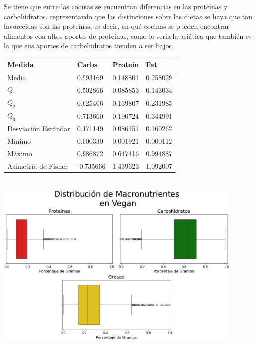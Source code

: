 \documentclass[12pt,a4paper]{article}
\begin{document}
{{{            Se tiene que entre las cocinas se encuentran diferencias en las 
            proteínas y carbohidratos, representando que las distinciones sobre 
            las dietas se haya que tan favorecidas son las proteínas, es decir, 
            en qué cocinas se pueden encontrar alimentos con altos aportes de proteínas, 
            como lo sería la asiática que también es la que sus aportes de carbohidratos 
            tienden a ser bajos. 

            \begin{center}
                \begin{tabular}{l|lll}
                    \toprule
                        Medida & Carbs & Protein & Fat \\
                    \midrule
                        Media               & 0.593169 & 0.148801 & 0.258029 \\
                        $Q_1$               & 0.502866 & 0.085853 & 0.143034 \\
                        $Q_2$               & 0.625406 & 0.139807 & 0.231985 \\
                        $Q_3$               & 0.713660 & 0.190724 & 0.344991 \\
                        Desviación Estándar & 0.171149 & 0.086151 & 0.160262 \\
                        Mínimo              & 0.000330 & 0.001921 & 0.000112 \\
                        Máximo              & 0.986872 & 0.647416 & 0.994887 \\
                        Asimetría de Fisher & -0.735666 & 1.439623 & 1.092007 \\
                    \bottomrule
                \end{tabular}\\
                \vspace{0.5cm}
                \includegraphics[width=0.9\textwidth]{Resources/EDA/Vegan_1.png}
            \end{center}       

}}}
\end{document}

